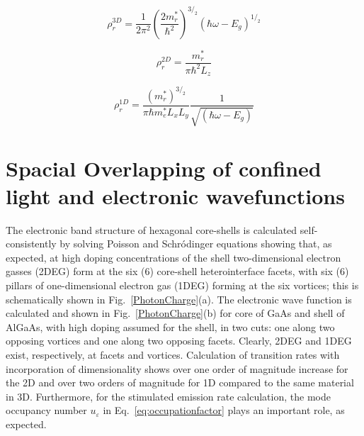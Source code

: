 \begin{equation}
\rho_r^{3D}=\frac{1}{2\pi^2}(\frac{2m_r^\ast}{\hbar^2})^{3/_2}(\hbar\omega-E_g)^{1/_2}
\label{eq:3DDOS}
\end{equation}

\begin{equation}
\rho_r^{2D}=\frac{m_r^\ast}{\pi\hbar^2{L_z}}
\label{eq:2DDOS}
\end{equation}

\begin{equation}
\rho_r^{1D}=\frac{{(m_r^\ast)}^{3/_2}}{\pi\hbar{m_e^\ast}{L_x}{L_y}}\frac{1}{\sqrt{(\hbar\omega-E_g)}}
\label{eq:1DDOS}
\end{equation}

\section[Spacial Overlapping]{Spacial Overlapping of confined light and electronic wavefunctions}

The electronic band structure of hexagonal core-shells is calculated
self-consistently by solving Poisson and Schr{\'o}dinger equations showing
that, as expected, at high doping concentrations of the shell two-dimensional
electron gasses (2DEG) form at the six (6) core-shell heterointerface facets,
with six (6) pillars of one-dimensional electron gas (1DEG) forming at the six
vortices; this is schematically shown in Fig.~\ref{PhotonCharge}(a). The
electronic wave function is calculated and shown in Fig.~\ref{PhotonCharge}(b)
for core of GaAs and shell of AlGaAs, with high doping assumed for the shell,
in two cuts: one along two opposing vortices and one along two opposing facets.
Clearly, 2DEG and 1DEG exist, respectively, at facets and vortices. Calculation
of transition rates with incorporation of dimensionality shows over one order
of magnitude increase for the 2D and over two orders of magnitude for 1D
compared to the same material in 3D. Furthermore, for the stimulated emission
rate calculation, the mode occupancy number $u_\varepsilon$ in
Eq.~\ref{eq:occupationfactor} plays an important role, as expected.

